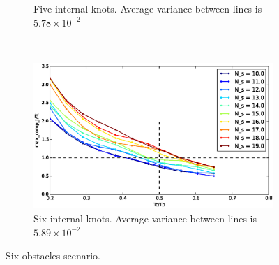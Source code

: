 \begin{figure}
\begin{subfigure}[b]{0.48\textwidth}
                \caption{Five internal knots.  Average variance between lines is $5.78\times 10^{-2}$}\label{fig:uni65}
        \end{subfigure}
        
        ~ %
        \begin{subfigure}[b]{0.48\textwidth}
                \includegraphics[width=\textwidth]{./img/realtime/Scenario_6__N_knots_6/mcttc-tctp.eps}
                \caption{Six internal knots.  Average variance between lines is $5.89\times 10^{-2}$}\label{fig:uni66}
        \end{subfigure}
        \caption{Six obstacles scenario.}\label{fig:uni6}
\end{figure}
%
%
%
